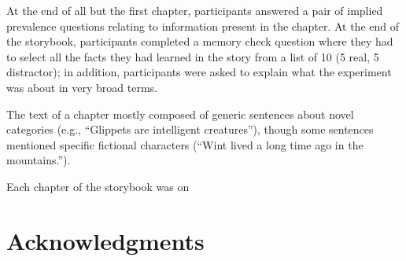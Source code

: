 \documentclass[10pt,letterpaper]{article}
\begin{document}
At the end of all but the first chapter, participants answered a pair of implied prevalence questions relating to information present in the chapter. 
At the end of the storybook, participants completed a memory check question where they had to select all the facts they had learned in the story from a list of 10 (5 real, 5 distractor); in addition, participants were asked to explain what the experiment was about in very broad terms.



The text of a chapter mostly composed of generic sentences about novel categories (e.g., ``Glippets are intelligent creatures''), though some sentences mentioned specific fictional characters (``Wint lived a long time ago in the mountains.'').

Each chapter of the storybook was on




\section{Acknowledgments}





\setlength{\bibleftmargin}{.125in}
\setlength{\bibindent}{-\bibleftmargin}


\end{document}
